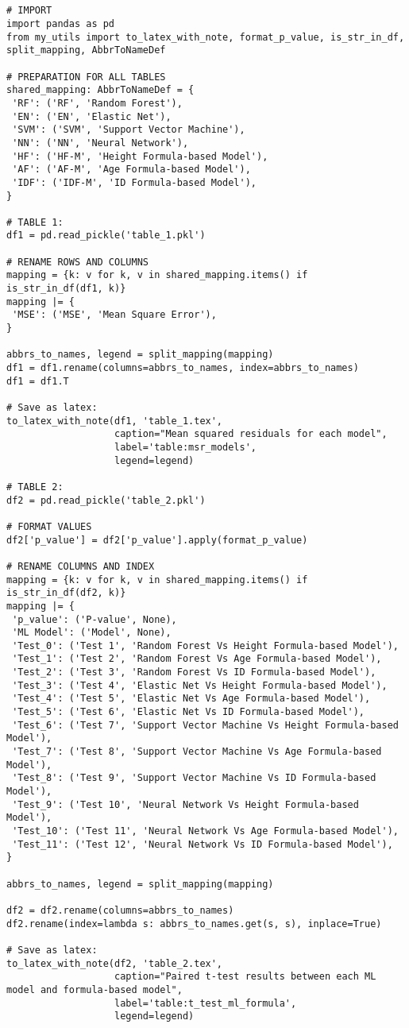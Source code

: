 \documentclass[11pt]{article}
\begin{document}
\begin{verbatim}


# IMPORT
import pandas as pd
from my_utils import to_latex_with_note, format_p_value, is_str_in_df, split_mapping, AbbrToNameDef

# PREPARATION FOR ALL TABLES
shared_mapping: AbbrToNameDef = {
 'RF': ('RF', 'Random Forest'),
 'EN': ('EN', 'Elastic Net'),
 'SVM': ('SVM', 'Support Vector Machine'),
 'NN': ('NN', 'Neural Network'),
 'HF': ('HF-M', 'Height Formula-based Model'),
 'AF': ('AF-M', 'Age Formula-based Model'),
 'IDF': ('IDF-M', 'ID Formula-based Model'),
}

# TABLE 1:
df1 = pd.read_pickle('table_1.pkl')

# RENAME ROWS AND COLUMNS 
mapping = {k: v for k, v in shared_mapping.items() if is_str_in_df(df1, k)}
mapping |= {
 'MSE': ('MSE', 'Mean Square Error'),
}

abbrs_to_names, legend = split_mapping(mapping)
df1 = df1.rename(columns=abbrs_to_names, index=abbrs_to_names)
df1 = df1.T

# Save as latex:
to_latex_with_note(df1, 'table_1.tex',
                   caption="Mean squared residuals for each model", 
                   label='table:msr_models',
                   legend=legend)

# TABLE 2:
df2 = pd.read_pickle('table_2.pkl')

# FORMAT VALUES
df2['p_value'] = df2['p_value'].apply(format_p_value)

# RENAME COLUMNS AND INDEX
mapping = {k: v for k, v in shared_mapping.items() if is_str_in_df(df2, k)}
mapping |= {
 'p_value': ('P-value', None),
 'ML Model': ('Model', None),
 'Test_0': ('Test 1', 'Random Forest Vs Height Formula-based Model'),
 'Test_1': ('Test 2', 'Random Forest Vs Age Formula-based Model'),
 'Test_2': ('Test 3', 'Random Forest Vs ID Formula-based Model'),
 'Test_3': ('Test 4', 'Elastic Net Vs Height Formula-based Model'),
 'Test_4': ('Test 5', 'Elastic Net Vs Age Formula-based Model'),
 'Test_5': ('Test 6', 'Elastic Net Vs ID Formula-based Model'),
 'Test_6': ('Test 7', 'Support Vector Machine Vs Height Formula-based Model'),
 'Test_7': ('Test 8', 'Support Vector Machine Vs Age Formula-based Model'),
 'Test_8': ('Test 9', 'Support Vector Machine Vs ID Formula-based Model'),
 'Test_9': ('Test 10', 'Neural Network Vs Height Formula-based Model'),
 'Test_10': ('Test 11', 'Neural Network Vs Age Formula-based Model'),
 'Test_11': ('Test 12', 'Neural Network Vs ID Formula-based Model'),
}

abbrs_to_names, legend = split_mapping(mapping)

df2 = df2.rename(columns=abbrs_to_names)
df2.rename(index=lambda s: abbrs_to_names.get(s, s), inplace=True)

# Save as latex:
to_latex_with_note(df2, 'table_2.tex', 
                   caption="Paired t-test results between each ML model and formula-based model",  
                   label='table:t_test_ml_formula', 
                   legend=legend)


\end{verbatim}
\end{document}
